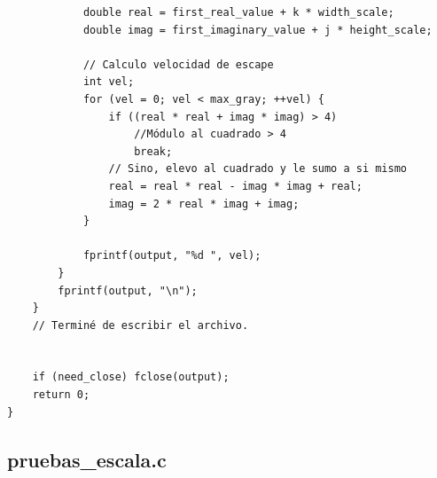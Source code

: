 \documentclass[a4paper,10pt]{article}
\begin{document}
\begin{verbatim}
			double real = first_real_value + k * width_scale;
			double imag = first_imaginary_value + j * height_scale;
			
			// Calculo velocidad de escape
			int vel;
			for (vel = 0; vel < max_gray; ++vel) {
				if ((real * real + imag * imag) > 4)
					//Módulo al cuadrado > 4
					break;
				// Sino, elevo al cuadrado y le sumo a si mismo
				real = real * real - imag * imag + real;
				imag = 2 * real * imag + imag;
			}
			
			fprintf(output, "%d ", vel);
		}
		fprintf(output, "\n");
	}
	// Terminé de escribir el archivo.
	
	
    if (need_close) fclose(output);
    return 0;
}
\end{verbatim}


\subsection{pruebas\_escala.c}
\end{document}

